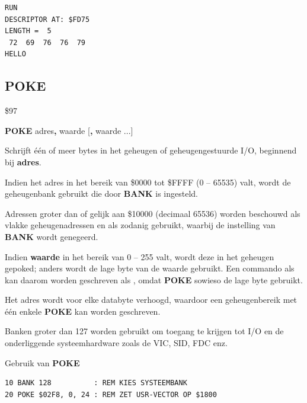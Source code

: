 \begin{description}[leftmargin=2cm,style=nextline]
\begin{tcolorbox}[colback=black,coltext=white]
\begin{verbatim}
RUN
DESCRIPTOR AT: $FD75
LENGTH =  5
 72  69  76  76  79
HELLO
\end{verbatim}
\end{tcolorbox}
\end{description}


\newpage
\subsection{POKE}
\begin{description}[leftmargin=2cm,style=nextline]
\item [Token:]    \$97

\item [Formaat:]   {\bf POKE} adres{\bf,} waarde [{\bf,} waarde ...]

\item [Retourneert:]  Schrijft één of meer bytes in het geheugen of geheugengestuurde I/O, beginnend bij {\bf adres}.

Indien het adres in het bereik van \$0000 tot \$FFFF (0 -- 65535) valt, wordt de geheugenbank gebruikt die door {\bf BANK} is ingesteld.

                  Adressen groter dan of gelijk aan \$10000 (decimaal 65536) worden beschouwd als vlakke geheugenadressen en als zodanig gebruikt, waarbij de instelling van {\bf BANK} wordt genegeerd.

                  Indien {\bf waarde} in het bereik van 0 -- 255 valt, wordt deze in het geheugen gepoked; anders wordt de lage byte van de waarde gebruikt. Een commando als  kan daarom worden geschreven als , omdat {\bf POKE} sowieso de lage byte gebruikt.

\item [Opmerkingen:]  Het adres wordt voor elke databyte verhoogd, waardoor een geheugenbereik met één enkele {\bf POKE} kan worden geschreven.

                  Banken groter dan 127 worden gebruikt om toegang te krijgen tot I/O en de onderliggende systeemhardware zoals de VIC, SID, FDC enz.

\item [Voorbeeld:]  Gebruik van {\bf POKE}

\begin{tcolorbox}[colback=black,coltext=white]
\verbatimfont{\codefont}
\begin{verbatim}
10 BANK 128          : REM KIES SYSTEEMBANK
20 POKE $02F8, 0, 24 : REM ZET USR-VECTOR OP $1800
\end{verbatim}
\end{tcolorbox}
\end{description}

